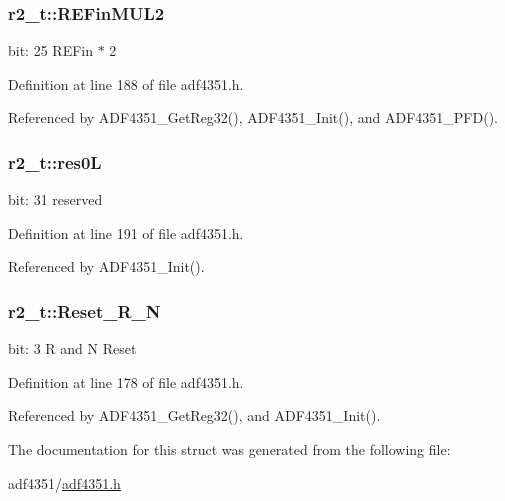 \subsubsection[{\texorpdfstring{R\+E\+Fin\+M\+U\+L2}{REFinMUL2}}]{ r2\+\_\+t\+::\+R\+E\+Fin\+M\+U\+L2}\hypertarget{structr2__t_aa675f6a674217e14be9e3e1754530a78}{}\label{structr2__t_aa675f6a674217e14be9e3e1754530a78}
bit\+: 25 R\+E\+Fin $\ast$ 2 

Definition at line 188 of file adf4351.\+h.



Referenced by A\+D\+F4351\+\_\+\+Get\+Reg32(), A\+D\+F4351\+\_\+\+Init(), and A\+D\+F4351\+\_\+\+P\+F\+D().

\subsubsection[{\texorpdfstring{res0L}{res0L}}]{ r2\+\_\+t\+::res0L}\hypertarget{structr2__t_af67e412a4c526894fee5ce321dfce083}{}\label{structr2__t_af67e412a4c526894fee5ce321dfce083}
bit\+: 31 reserved 

Definition at line 191 of file adf4351.\+h.



Referenced by A\+D\+F4351\+\_\+\+Init().

\subsubsection[{\texorpdfstring{Reset\+\_\+\+R\+\_\+N}{Reset_R_N}}]{ r2\+\_\+t\+::\+Reset\+\_\+\+R\+\_\+N}\hypertarget{structr2__t_a21c5fab8a85d13d5e47de5588780b094}{}\label{structr2__t_a21c5fab8a85d13d5e47de5588780b094}
bit\+: 3 R and N Reset 

Definition at line 178 of file adf4351.\+h.



Referenced by A\+D\+F4351\+\_\+\+Get\+Reg32(), and A\+D\+F4351\+\_\+\+Init().



The documentation for this struct was generated from the following file\+:\begin{DoxyCompactItemize}
\item 
adf4351/\hyperlink{adf4351_8h}{adf4351.\+h}\end{DoxyCompactItemize}
